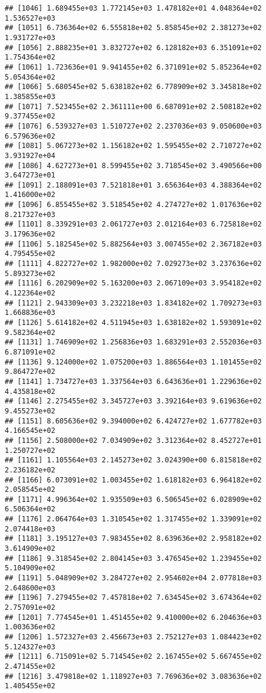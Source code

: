 \documentclass[]{article}
\begin{document}
\begin{verbatim}
## [1046] 1.689455e+03 1.772145e+03 1.478182e+01 4.048364e+02 1.536527e+03
## [1051] 6.736364e+02 6.555818e+02 5.858545e+02 2.381273e+02 1.931727e+03
## [1056] 2.888235e+01 3.832727e+02 6.128182e+03 6.351091e+02 1.754364e+02
## [1061] 1.723636e+01 9.941455e+02 6.371091e+02 5.852364e+02 5.054364e+02
## [1066] 5.680545e+02 5.638182e+02 6.778909e+02 3.345818e+02 1.385855e+03
## [1071] 7.523455e+02 2.361111e+00 6.687091e+02 2.508182e+02 9.377455e+02
## [1076] 6.539327e+03 1.510727e+02 2.237036e+03 9.050600e+03 6.579636e+02
## [1081] 5.067273e+02 1.156182e+02 1.595455e+02 2.710727e+02 3.931927e+04
## [1086] 4.627273e+01 8.599455e+02 3.718545e+02 3.490566e+00 3.647273e+01
## [1091] 2.188091e+03 7.521818e+01 3.656364e+03 4.388364e+02 1.416000e+02
## [1096] 6.855455e+02 3.518545e+02 4.274727e+02 1.017636e+02 8.217327e+03
## [1101] 8.339291e+03 2.061727e+03 2.012164e+03 6.725818e+02 3.179636e+02
## [1106] 5.182545e+02 5.882564e+03 3.007455e+02 2.367182e+03 4.795455e+02
## [1111] 4.822727e+02 1.982000e+02 7.029273e+02 3.237636e+02 5.893273e+02
## [1116] 6.202909e+02 5.163200e+03 2.067109e+03 3.954182e+02 4.122364e+02
## [1121] 2.943309e+03 3.232218e+03 1.834182e+02 1.709273e+03 1.668836e+03
## [1126] 5.614182e+02 4.511945e+03 1.638182e+02 1.593091e+02 9.582364e+02
## [1131] 1.746909e+02 1.256836e+03 1.683291e+03 2.552036e+03 6.871091e+02
## [1136] 9.124000e+02 1.075200e+03 1.886564e+03 1.101455e+02 9.864727e+02
## [1141] 1.734727e+03 1.337564e+03 6.643636e+01 1.229636e+02 4.435818e+02
## [1146] 2.275455e+02 3.345727e+03 3.392164e+03 9.619636e+02 9.455273e+02
## [1151] 8.605636e+02 9.394000e+02 6.424727e+02 1.677782e+03 4.166545e+02
## [1156] 2.508000e+02 7.034909e+02 3.312364e+02 8.452727e+01 1.250727e+02
## [1161] 1.105564e+03 2.145273e+02 3.024390e+00 6.815818e+02 2.236182e+02
## [1166] 6.073091e+02 1.003455e+02 1.618182e+03 6.964182e+02 2.058545e+02
## [1171] 4.996364e+02 1.935509e+03 6.506545e+02 6.028909e+02 6.506364e+02
## [1176] 2.064764e+03 1.310545e+02 1.317455e+02 1.339091e+02 2.074418e+03
## [1181] 3.195127e+03 7.983455e+02 8.639636e+02 2.958182e+02 3.614909e+02
## [1186] 9.318545e+02 2.804145e+03 3.476545e+02 1.239455e+02 5.104909e+02
## [1191] 5.048909e+02 3.284727e+02 2.954602e+04 2.077818e+03 2.648600e+03
## [1196] 7.279455e+02 7.457818e+02 7.634545e+02 3.674364e+02 2.757091e+02
## [1201] 7.774545e+01 1.451455e+02 9.410000e+02 6.204636e+03 1.003636e+02
## [1206] 1.572327e+03 2.456673e+03 2.752127e+03 1.084423e+02 5.124327e+03
## [1211] 6.715091e+02 5.714545e+02 2.167455e+02 5.667455e+02 2.471455e+02
## [1216] 3.479818e+02 1.118927e+03 7.769636e+02 3.083636e+02 1.405455e+02

\end{verbatim}
\end{document}
